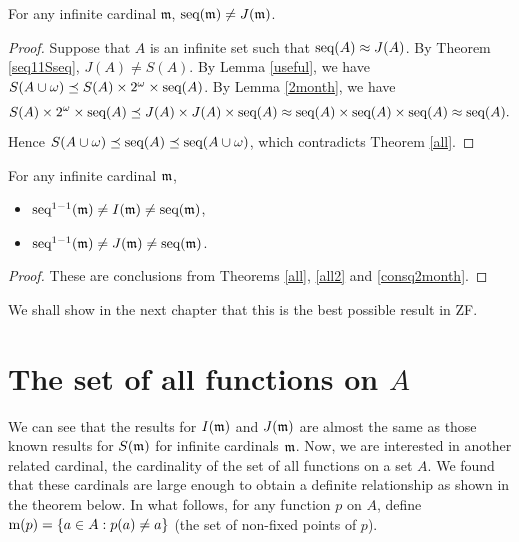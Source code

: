 \begin{theorem}\label{consq2month}
For any infinite cardinal $\mathfrak{m}$, $\seq(\mathfrak{m})\neq J(\mathfrak{m})$.
\end{theorem}

\begin{proof}
Suppose that $A$ is an infinite set such that 
$\seq(A)\approx J(A)$. By Theorem \ref{seq11Sseq}, $J(A) \neq S(A)$. By Lemma \ref{useful}, we have $S(A\cup\omega)\preceq S(A)\times 2^{\omega}\times \seq(A)$. By Lemma \ref{2month}, we have $$S(A)\times 2^{\omega}\times \seq(A) \preceq J(A) \times J(A) \times \seq(A) \approx \seq(A) \times \seq(A) \times \seq(A) \approx \seq(A).$$ Hence $S(A\cup\omega)\preceq\seq(A)\preceq\seq(A\cup\omega)$, which contradicts Theorem \ref{all}.
\end{proof}


 \begin{corollary}\label{IJseqneq}
     For any infinite cardinal $\frak{m}$, 
     \begin{itemize}
         \item[1)]  $\seq^{1-1}(\frak{m}) \neq I(\frak{m}) \neq \seq(\frak{m})$,
         \item[2)]  $\seq^{1-1}(\frak{m}) \neq J(\frak{m}) \neq \seq(\frak{m})$.
     \end{itemize}
 \end{corollary}
 
 \begin{proof}
 These are conclusions from Theorems \ref{all}, \ref{all2} and \ref{consq2month}.    
 \end{proof}

 We shall show in the next chapter that this is the best possible result in ZF.





\section{The set of all functions on $A$}

We can see that the results for $I(\frak{m})$ and $J(\frak{m})$ are almost the same as those known results for $S(\frak{m})$ for infinite cardinals $\frak{m}$. Now, we are interested in another related cardinal, the cardinality of the set of all functions on a set $A$. We found that these cardinals are large enough to obtain a definite relationship as shown in the theorem below. In what follows, for any function $p$ on $A$, define $\m(p)=\{a\in A : p(a) \neq a\}$ (the set of non-fixed points of $p$).

